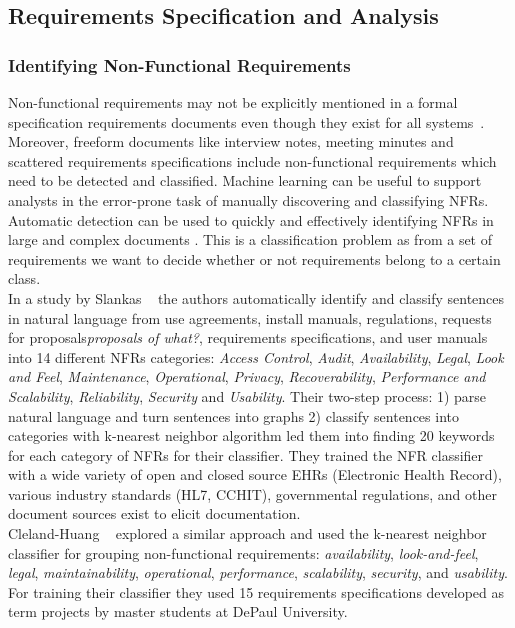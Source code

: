 \subsection{Requirements Specification and Analysis}

\subsubsection{Identifying Non-Functional Requirements}

Non-functional requirements may not be explicitly mentioned in a formal
specification requirements documents even though they exist for all
systems~\cite{Slankas:2013}. Moreover, freeform documents like interview notes,
meeting minutes and scattered requirements specifications include non-functional
requirements which need to be detected and classified. Machine learning can be
useful to support analysts in the error-prone task of manually discovering and
classifying NFRs. Automatic detection can be used to quickly and effectively
identifying NFRs in large and complex documents \cite{Cleland-Huang2007}. This
is a classification problem as from a set of requirements we want to decide
whether or not requirements belong to a certain class. \\

In a study by Slankas \etal~\cite{Slankas:2013} the authors automatically
identify and classify sentences in natural language from use agreements, install
manuals, regulations, requests for proposals\emph{proposals of what?},
requirements specifications, and user manuals into 14 different NFRs categories:
\emph{Access Control}, \emph{Audit}, \emph{Availability}, \emph{Legal},
\emph{Look and Feel}, \emph{Maintenance}, \emph{Operational}, \emph{Privacy},
\emph{Recoverability}, \emph{Performance and Scalability}, \emph{Reliability},
\emph{Security} and \emph{Usability}.
Their two-step process: 1) parse natural language and turn sentences into graphs
2) classify sentences into categories with k-nearest neighbor algorithm led them
into finding 20 keywords for each category of NFRs for their
classifier. They trained the NFR classifier
with a wide variety of open and closed source EHRs (Electronic Health Record),
various industry standards (HL7, CCHIT), governmental regulations, and other
document sources exist to elicit documentation.\\

Cleland-Huang \etal~\cite{Cleland-Huang2007} explored a similar approach and
used the k-nearest neighbor classifier for grouping non-functional requirements:
\emph{availability}, \emph{look-and-feel}, \emph{legal}, \emph{maintainability},
\emph{operational}, \emph{performance}, \emph{scalability}, \emph{security}, and
\emph{usability}. For training their classifier they used 15 requirements
specifications developed as term projects by master students at DePaul University.

